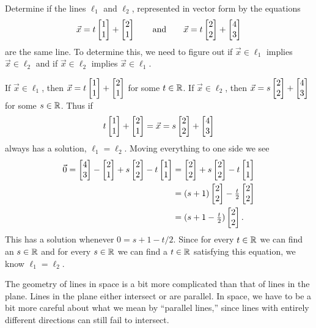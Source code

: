 \begin{example}
	Determine if the lines $\ell_1$ and $\ell_2$, represented in vector form by the equations
	\[
		\vec x=t\mat{1\\1}+\mat{2\\1}\qquad\text{and}\qquad 
		\vec x=t\mat{2\\2}+\mat{4\\3}
	\]
	are the same line.  To determine this, we need to figure out if $\vec x\in\ell_1$
	implies $\vec x\in \ell_2$ and if $\vec x\in\ell_2$ implies $\vec x\in\ell_1$.  

	If $\vec x\in\ell_1$, then $\vec x=t\mat{1\\1}+\mat{2\\1}$ for some $t\in\mathbb{R}$.  If
	$\vec x\in\ell_2$, then $\vec x=s\mat{2\\2}+\mat{4\\3}$ for some $s\in \mathbb{R}$.  Thus if
	\[
		t\mat{1\\1}+\mat{2\\1} = \vec x = s\mat{2\\2}+\mat{4\\3}
	\]
	always has a solution, $\ell_1=\ell_2$.  Moving everything to one side we see
	\begin{align*}
		\vec 0 = \mat{4\\3}-\mat{2\\1} + s\mat{2\\2}-t\mat{1\\1}
		&=\mat{2\\2}+s\mat{2\\2}-t\mat{1\\1}\\
		&=(s+1)\mat{2\\2}-\tfrac{t}{2}\mat{2\\2}\\
		&= (s+1-\tfrac{t}{2})\mat{2\\2}.
	\end{align*}
	This has a solution whenever $0=s+1-t/2$.  Since for every $t\in\mathbb{R}$ we can find an $s\in\mathbb{R}$
	and for every $s\in \mathbb{R}$ we can find a $t\in \mathbb{R}$ satisfying this equation, we know $\ell_1=\ell_2$.
\end{example}


The geometry of lines in space is a bit more complicated than that of lines
in the plane.  Lines in the plane either intersect or are parallel.
In space,  we have to be a bit more careful about what we mean by
``parallel lines,'' since lines with entirely different directions can
still fail to intersect.

